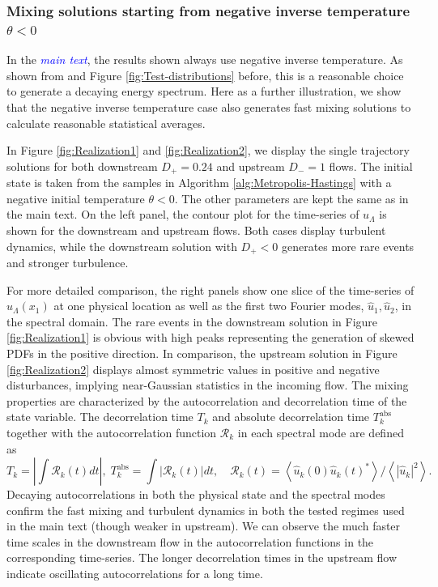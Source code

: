 \documentclass[9pt,twoside,lineno]{pnas-new}
\theoremstyle{plain}
\theoremstyle{plain}
\begin{document}
\subsubsection*{Mixing solutions starting from negative inverse temperature $\theta<0$}

In the \textcolor{blue}{\emph{main text}}, the results shown always use negative inverse
temperature. As shown from \cite{abramov2003hamiltonian,bajars2013weakly}
and Figure \ref{fig:Test-distributions} before, this is a reasonable
choice to generate a decaying energy spectrum. Here as a further illustration,
we show that the negative inverse temperature case also generates
fast mixing solutions to calculate reasonable statistical averages.

In Figure \ref{fig:Realization1} and \ref{fig:Realization2}, we
display the single trajectory solutions for both downstream $D_{+}=0.24$
and upstream $D_{-}=1$ flows. The initial state is taken from the
samples in Algorithm \ref{alg:Metropolis-Hastings} with a negative
initial temperature $\theta<0$. The other parameters are kept the
same as in the main text. On the left panel, the contour plot for
the time-series of $u_{\Lambda}$ is shown for the downstream and
upstream flows. Both cases display turbulent dynamics, while the downstream
solution with $D_{+}<0$ generates more rare events and stronger turbulence.

For more detailed comparison, the right panels show one slice of the
time-series of $u_{\Lambda}\left(x_{1}\right)$ at one physical location
as well as the first two Fourier modes, $\hat{u}_{1},\hat{u}_{2}$,
in the spectral domain. The rare events in the downstream solution
in Figure \ref{fig:Realization1} is obvious with high peaks representing
the generation of skewed PDFs in the positive direction. In comparison,
the upstream solution in Figure \ref{fig:Realization2} displays almost
symmetric values in positive and negative disturbances, implying near-Gaussian
statistics in the incoming flow. The mixing properties are characterized
by the autocorrelation and decorrelation time of the state variable.
The decorrelation time $T_{k}$ and absolute decorrelation time $T_{k}^{\mathrm{abs}}$
together with the autocorrelation function $\mathcal{R}_{k}$ in each
spectral mode are defined as
\[
T_{k}=\left|\int\mathcal{R}_{k}\left(t\right)dt\right|,\;T_{k}^{\mathrm{abs}}=\int\left|\mathcal{R}_{k}\left(t\right)\right|dt,\quad\mathcal{R}_{k}\left(t\right)=\left\langle \hat{u}_{k}\left(0\right)\hat{u}_{k}\left(t\right)^{*}\right\rangle /\left\langle \left|\hat{u}_{k}\right|^{2}\right\rangle .
\]
Decaying autocorrelations in both the physical state and the spectral
modes confirm the fast mixing and turbulent dynamics in both the tested
regimes used in the main text (though weaker in upstream). We can
observe the much faster time scales in the downstream flow in the
autocorrelation functions in the corresponding time-series. The longer
decorrelation times in the upstream flow indicate oscillating autocorrelations
for a long time.
\end{document}
